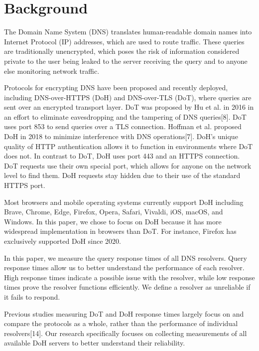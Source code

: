 \section{Background}\label{sec:back}

The Domain Name System (DNS) translates human-readable domain names into Internet Protocol (IP) addresses, which are used to route traffic.
These queries are traditionally unencrypted, which poses the risk of information considered private to the user being leaked to the server receiving the query and to anyone else monitoring network traffic. 

Protocols for encrypting DNS have been proposed and recently deployed, including DNS-over-HTTPS (DoH) and DNS-over-TLS (DoT), where queries are sent over an encrypted transport layer.
DoT was proposed by Hu et al. in 2016 in an effort to eliminate eavesdropping and the tampering of DNS queries[8].
DoT uses port 853 to send queries over a TLS connection.
Hoffman et al. proposed DoH in 2018 to minimize interference with DNS operations[7].
DoH's unique quality of HTTP authentication allows it to function in environments where DoT does not.
In contrast to DoT, DoH uses port 443 and an HTTPS connection.
DoT requests use their own special port, which allows for anyone on the network level to find them.
DoH requests stay hidden due to their use of the standard HTTPS port.

Most browsers and mobile operating systems currently support DoH including Brave, Chrome, Edge, Firefox, Opera, Safari, Vivaldi, iOS, macOS, and Windows.
In this paper, we chose to focus on DoH because it has more widespread implementation in browsers than DoT.
For instance, Firefox has exclusively supported DoH since 2020.

In this paper, we measure the query response times of all DNS resolvers.
Query response times allow us to better understand the performance of each resolver.
High response times indicate a possible issue with the resolver, while low response times prove the resolver functions efficiently.
We define a resolver as unreliable if it fails to respond.  

Previous studies measuring DoT and DoH response times largely focus on and compare the protocols as a whole, rather than the performance of individual resolvers[14].
Our research specifically focuses on collecting measurements of all available DoH servers to better understand their reliability.
